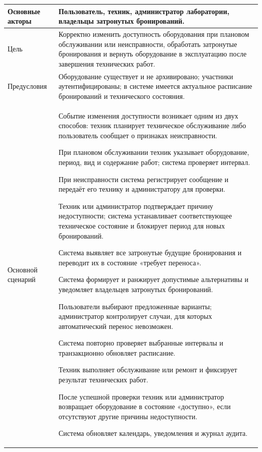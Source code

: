 \documentclass[12pt,a4paper]{article}
\begin{document}
\begin{longtable}{|p{}|p{}|}
\hline
Основные акторы & Пользователь, техник, администратор лаборатории, владельцы затронутых бронирований. \\
\hline
Цель & Корректно изменить доступность оборудования при плановом обслуживании или
неисправности, обработать затронутые бронирования и вернуть оборудование в
эксплуатацию после завершения технических работ. \\
\hline
Предусловия & Оборудование существует и не архивировано; участники аутентифицированы;
в системе имеется актуальное расписание бронирований и технического состояния. \\
\hline
Основной сценарий &
\begin{ucsteps}
    \item Событие изменения доступности возникает одним из двух способов: техник планирует техническое обслуживание либо пользователь сообщает о признаках неисправности.
    \item При плановом обслуживании техник указывает оборудование, период, вид и содержание работ; система проверяет интервал.
    \item При неисправности система регистрирует сообщение и передаёт его технику и администратору для проверки.
    \item Техник или администратор подтверждает причину недоступности; система устанавливает соответствующее техническое состояние и блокирует период для новых бронирований.
    \item Система выявляет все затронутые будущие бронирования и переводит их в состояние «требует переноса».
    \item Система формирует и ранжирует допустимые альтернативы и уведомляет владельцев затронутых бронирований.
    \item Пользователи выбирают предложенные варианты; администратор контролирует случаи, для которых автоматический перенос невозможен.
    \item Система повторно проверяет выбранные интервалы и транзакционно обновляет расписание.
    \item Техник выполняет обслуживание или ремонт и фиксирует результат технических работ.
    \item После успешной проверки техник или администратор возвращает оборудование в состояние «доступно», если отсутствуют другие причины недоступности.
    \item Система обновляет календарь, уведомления и журнал аудита.
\end{ucsteps} \\

\end{longtable}
\end{document}
